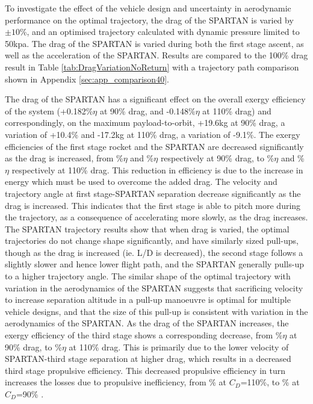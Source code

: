 To investigate the effect of the vehicle design and uncertainty in aerodynamic performance on the optimal trajectory, the drag of the SPARTAN is varied by $\pm10$\%, and an optimised trajectory calculated with dynamic pressure limited to 50kpa. The drag of the SPARTAN is varied during both the first stage ascent, as well as the acceleration of the SPARTAN. Results are compared to the 100\% drag result in Table \ref{tab:DragVariationNoReturn} with a trajectory path comparison shown in Appendix \ref{sec:app_comparison40}. 

The drag of the SPARTAN has a significant effect on the overall exergy efficiency of the system (+0.182\%$\eta$ at 90\% drag, and -0.148\%$\eta$ at 110\% drag) and correspondingly, on the maximum payload-to-orbit, +19.6kg at 90\% drag, a variation of +10.4\% and -17.2kg at 110\% drag, a variation of -9.1\%. The exergy efficiencies of the first stage rocket and the SPARTAN are decreased significantly as the drag is increased, from \firstExergyEffCdNinetyNoReturn\%$\eta$ and \secondExergyEffCdNinetyNoReturn\%$\eta$ respectively at 90\% drag, to \firstExergyEffCdOneHundredTenNoReturn\%$\eta$ and \secondExergyEffCdOneHundredTenNoReturn\%$\eta$ respectively at 110\% drag. This reduction in efficiency is due to the increase in energy which must be used to overcome the added drag. 
The velocity and trajectory angle at first stage-SPARTAN separation decrease significantly as the drag is increased. This indicates that the first stage is able to pitch more during the trajectory, as a consequence of accelerating more slowly, as the drag increases.
The SPARTAN trajectory results show that when drag is varied, the optimal trajectories do not change shape significantly, and have similarly sized pull-ups, though as the drag is increased (ie. L/D is decreased), the second stage follows a slightly slower and hence lower flight path, and the SPARTAN generally pulls-up to a higher trajectory angle. The similar shape of the optimal trajectory with variation in the aerodynamics of the SPARTAN suggests that sacrificing velocity to increase separation altitude in a pull-up manoeuvre is optimal for multiple vehicle designs, and that the size of this pull-up is consistent with variation in the aerodynamics of the SPARTAN.
As the drag of the SPARTAN increases, the exergy efficiency of the third stage shows a corresponding decrease, from \thirddExergyEffCdNinetyNoReturn\%$\eta$ at 90\% drag, to \thirddExergyEffCdOneHundredTenNoReturn\%$\eta$ at 110\% drag.
This is primarily due to the lower velocity of SPARTAN-third stage separation at higher drag, which results in a decreased third stage propulsive efficiency. This decreased propulsive efficiency in turn increases the losses due to propulsive inefficiency, from \PlossthreeCombinedCdOneHundredTenNoReturn\% at $C_D$=110\%, to \PlossthreeCombinedCdNinetyNoReturn\% at $C_D$=90\% .

